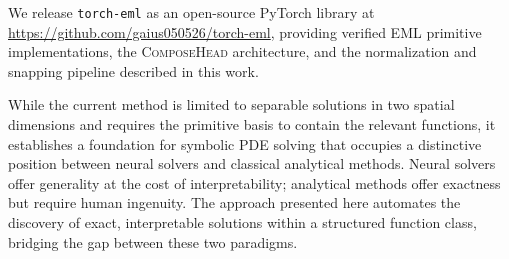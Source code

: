 We release \texttt{torch-eml} as an open-source PyTorch library at
\url{https://github.com/gaius050526/torch-eml}, providing verified EML
primitive implementations, the \textsc{ComposeHead} architecture, and the
normalization and snapping pipeline described in this work.

While the current method is limited to separable solutions in two spatial
dimensions and requires the primitive basis to contain the relevant functions,
it establishes a foundation for symbolic PDE solving that occupies a distinctive
position between neural solvers and classical analytical methods.  Neural
solvers offer generality at the cost of interpretability; analytical methods
offer exactness but require human ingenuity.  The approach presented here
automates the discovery of exact, interpretable solutions within a structured
function class, bridging the gap between these two paradigms.
